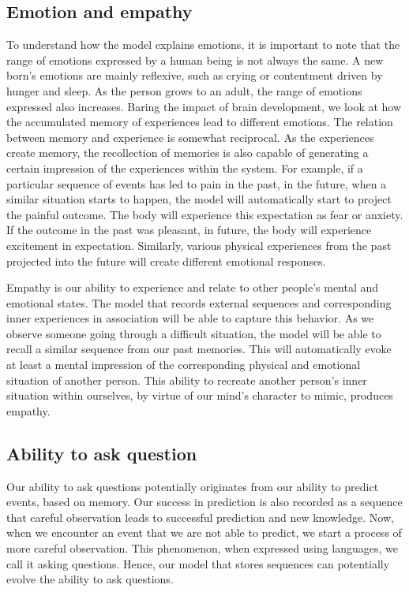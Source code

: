 \documentclass[reprint,amsmath,amssymb,apr,aip,onecolumn, 11pt]{revtex4-1}
\begin{document}
\subsection{Emotion and empathy}
To understand how the model explains emotions, it is important to note that the range of emotions expressed by a human being is not always the same. A new born's emotions are mainly reflexive, such as crying or contentment driven by hunger and sleep. As the person grows to an adult, the range of emotions expressed also increases\cite{Berk_2017}. Baring the impact of brain development, we look at how the accumulated memory of experiences lead to different emotions. The relation between memory and experience is somewhat reciprocal. As the experiences create memory, the recollection of memories is also capable of generating a certain impression of the experiences within the system.  For example, if a particular sequence of events has led to pain in the past, in the future, when a similar situation starts to happen, the model will automatically start to project the painful outcome. The body will experience this expectation as fear or anxiety. If the outcome in the past was pleasant, in future, the body will experience excitement in expectation. Similarly, various physical experiences from the past projected into the future will create different emotional responses.

Empathy is our ability to experience and relate to other people's mental and emotional states. The model that records external sequences and corresponding inner experiences in association will be able to capture this behavior. As we observe someone going through a difficult situation, the model will be able to recall a similar sequence from our past memories. This will automatically evoke at least a mental impression of the corresponding physical and emotional situation of another person. This ability to recreate another person's inner situation within ourselves, by virtue of our mind's character to mimic, produces empathy.  

\subsection{Ability to ask question}
Our ability to ask questions potentially originates from our ability to predict events, based on memory. Our success in prediction is also recorded as a sequence that careful observation leads to successful prediction and new knowledge. Now, when we encounter an event that we are not able to predict, we start a process of more careful observation. This phenomenon, when expressed using languages, we call it asking questions. Hence, our model that stores sequences can potentially evolve the ability to ask questions. 
\end{document}
